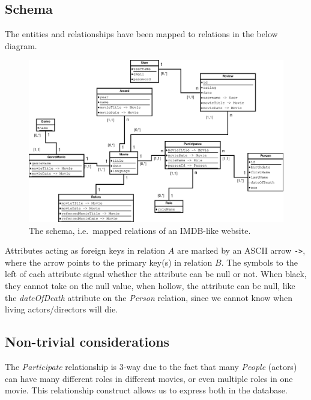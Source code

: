 \subsection{Schema}
The entities and relationships have been mapped to relations in the below diagram.
\begin{figure}[H]
  \centering
  \includegraphics[width=\linewidth]{2-17.02.14/DatabaseSchema.eps}
  \caption{The schema, i.e.\ mapped relations of an IMDB-like website.}\label{fig:schema}
\end{figure}
Attributes acting as foreign keys in relation $A$ are marked by an ASCII arrow \texttt{->}, where the arrow points to the primary key(s) in relation $B$. The symbols to the left of each attribute signal whether the attribute can be null or not. When black, they cannot take on the null value, when hollow, the attribute can be null, like the \emph{dateOfDeath} attribute on the \emph{Person} relation, since we cannot know when living actors/directors will die.

\subsection{Non-trivial considerations}
The \emph{Participate} relationship is 3-way due to the fact that many \emph{People} (actors) can have many different roles in different movies, or even multiple roles in one movie. This relationship construct allows us to express both in the database.


